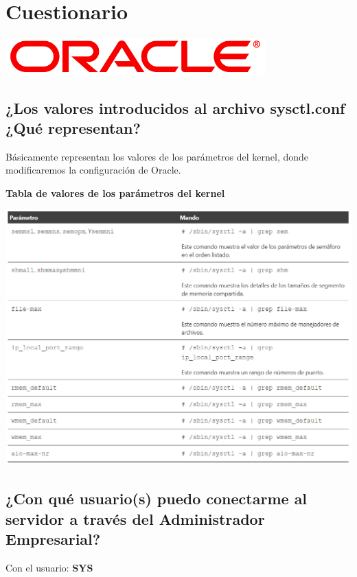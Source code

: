 \documentclass[12pt,letterpaper]{article}
\begin{document}
\section{Cuestionario}
\vspace{12pt}
\begin{center}
\includegraphics[width=10cm]{Imagenes/Oracle_logo.png}\\
\end{center}
\vspace{12pt}
\subsection{¿Los valores introducidos al archivo sysctl.conf ¿Qué representan?}
\vspace{12pt}
{\hspace{12mm}Básicamente representan los valores de los parámetros del kernel, donde modificaremos la configuración de Oracle.} \\

\begin{center}
\textbf{Tabla de valores de los parámetros del kernel}
\end{center}
\begin{center}
  \includegraphics[width=14cm]{Imagenes/Tabla_parametros.png}\\
\end{center}


\subsection{¿Con qué usuario(s) puedo conectarme al servidor a través del Administrador Empresarial?}
\vspace{12pt}
{\hspace{12mm}Con el usuario: \textbf{SYS}} \\
\end{document}
